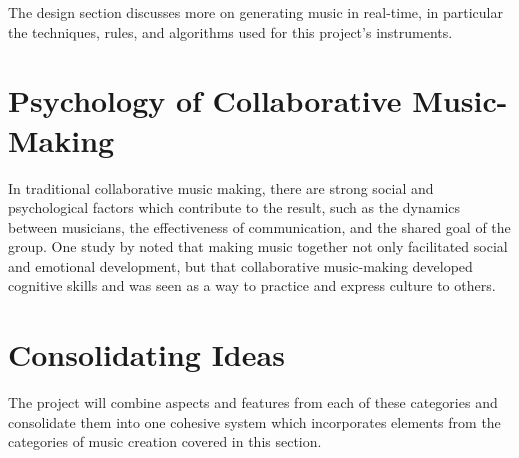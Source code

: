 The design section discusses more on generating music in real-time, in particular the techniques, rules, and algorithms used for this project’s instruments.

\section{Psychology of Collaborative Music-Making}
In traditional collaborative music making, there are strong social and psychological factors which contribute to the result, such as the dynamics between musicians, the effectiveness of communication, and the shared goal of the group. One study by \cite{cunha2012secondary} noted that making music together not only facilitated social and emotional development, but that collaborative music-making developed cognitive skills and was seen as a way to practice and express culture to others.

\section{Consolidating Ideas}
The project will combine aspects and features from each of these categories and consolidate them into one cohesive system which incorporates elements from the categories of music creation covered in this section.
